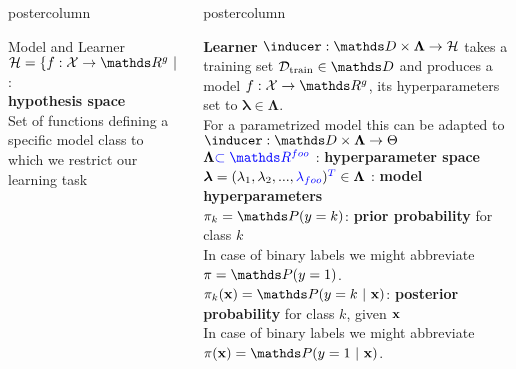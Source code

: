 \documentclass{beamer}
\newlength{\columnheight} %
\begin{document}
\begin{frame}[fragile]{}
\begin{columns}
\begin{column}{.31\textwidth}
\begin{beamercolorbox}[center]{postercolumn}
\begin{minipage}{.98\textwidth}
{\begin{myblock}{Model and Learner}
$\Hspace = \{f : \Xspace \rightarrow \R^g ~|~ f \text{ belongs to a certain functional family}\}$ : \\ \textbf{hypothesis space} \\
  \hspace*{1ex}Set of functions defining a specific model class to which we restrict our \\
  \hspace*{1ex}learning task 					
\end{myblock}\vfill
				}
			\end{minipage}
		\end{beamercolorbox}
	\end{column}
	\begin{column}{.31\textwidth}
		\begin{beamercolorbox}[center]{postercolumn}
			\begin{minipage}{.98\textwidth}
				\parbox[t][\columnheight]{\textwidth}{
\begin{myblock}{} \vspace{-4ex}
\textbf{Learner }$\inducer: \preimageInducerShort \rightarrow \Hspace$  takes a training set  $\Dtrain \in \allDatasets$  and produces a model $f : \Xspace \rightarrow \R^g$, its hyperparameters set to $\bm{\lambda} \in \bm{\Lambda}$.\\
\hspace*{1ex}For a parametrized model this can be adapted to $\inducer: \preimageInducerShort \rightarrow \Theta$ \\

$\bm{\Lambda} \textcolor{blue}{\subset \R^{foo}}$ : \textbf{hyperparameter space} \\

$\bm{\lambda} = (\lambda_1, \lambda_2, ..., \textcolor{blue}{\lambda_{foo}})^{\textcolor{blue}{T}} \in \bm{\Lambda}$ : \textbf{model hyperparameters} \\

$\pi_k = \P(y = k)$:\textbf{ prior probability} for class $k$ \\
  \hspace*{1ex}In case of binary labels we might abbreviate $\pi = \P(y = 1)$. \\

$\pikx = \postk$: \textbf{posterior probability} for class $k$, given $\mathbf{x}$ \\
  \hspace*{1ex}In case of binary labels we might abbreviate $\pix = \post$. \\


\end{myblock}}
\end{minipage}
\end{beamercolorbox}
\end{column}
\end{columns}
\end{frame}
\end{document}
